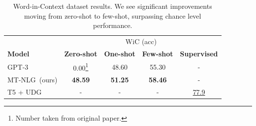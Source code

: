 \documentclass[11pt]{article}
\newcommand{\ours}{MT-NLG}
\begin{document}

\begin{savenotes}
\begin{table}[t]
\centering
\small
\begin{tabular}{l c c c c}
 \toprule
 & \multicolumn{4}{c}{WiC (acc)} \\
 \cmidrule{2-5}
 \textbf{Model} &  \textbf{Zero-shot}  &  \textbf{One-shot} &  \textbf{Few-shot} & \textbf{Supervised} \\
 \midrule
 GPT-3  &   0.00\footnote{Number taken from original paper.}   &   48.60   &   55.30 & -  \\
 \ours~(ours)	&	\textbf{48.59}	&	\textbf{51.25}	&	\textbf{58.46} & -	\\
 \cmidrule{1-5}
 T5 + UDG & - & - & - & \underline{77.9} \\
 \bottomrule
\end{tabular}
\caption{Word-in-Context dataset results. We see significant improvements moving from zero-shot to few-shot, surpassing chance level performance.}
\label{tab:wic-perf}
\end{table}
\end{savenotes}

\end{document}
